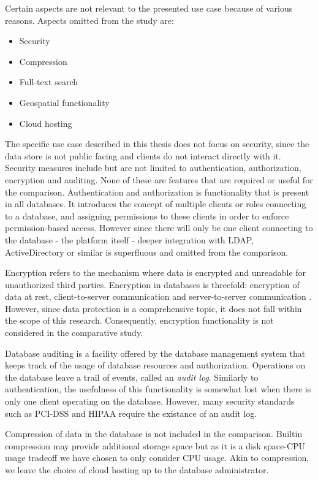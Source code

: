 Certain aspects are not relevant to the presented use case because of various reasons.
Aspects omitted from the study are:

\begin{itemize}
  \item Security
  \item Compression
  \item Full-text search
  \item Geospatial functionality
  \item Cloud hosting
\end{itemize}

The specific use case described in this thesis does not focus on security, since the data store is not public facing and clients do not interact directly with it.
Security measures include but are not limited to authentication, authorization, encryption and auditing.
None of these are features that are required or useful for the comparison.
Authentication and authorization is functionality that is present in all databases.
It introduces the concept of multiple clients or roles connecting to a database, and assigning permissions to these clients in order to enforce permission-based access.
However since there will only be one client connecting to the database - the platform itself - deeper integration with LDAP, ActiveDirectory or similar is superfluous and omitted from the comparison.

Encryption refers to the mechanism where data is encrypted and unreadable for unauthorized third parties.
Encryption in databases is threefold: encryption of data at rest, client-to-server communication and server-to-server communication \autocite{Grolinger2013}.
However, since data protection is a comprehensive topic, it does not fall within the scope of this research.
Consequently, encryption functionality is not considered in the comparative study.

Database auditing is a facility offered by the database management system that keeps track of the usage of database resources and authorization.
Operations on the database leave a trail of events, called an \textit{audit log}.
Similarly to authentication, the usefulness of this functionality is somewhat lost when there is only one client operating on the database.
However, many security standards such as PCI-DSS and HIPAA require the existance of an audit log.

Compression of data in the database is not included in the comparison.
Builtin compression may provide additional storage space but as it is a disk space-CPU usage tradeoff we have chosen to only consider CPU usage.
Akin to compression, we leave the choice of cloud hosting up to the database administrator.

